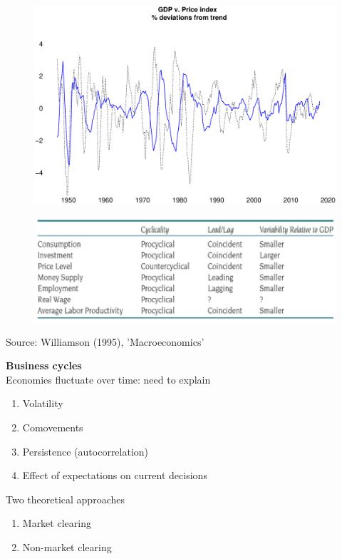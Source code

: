 \documentclass{beamer}
\begin{document}
\begin{frame}
  \begin{figure}
    \includegraphics[scale=.25]{business_cycle3.eps}
  \end{figure}
\end{frame}

\begin{frame}
  \begin{figure}
    \includegraphics[scale=.8]{williamson.eps}
  \end{figure}
  Source: Williamson (1995), 'Macroeconomics'
\end{frame}

\begin{frame}
  \textbf{Business cycles}\\
  Economies fluctuate over time: need to explain
  \begin{enumerate}
    \item Volatility
    \item Comovements
    \item Persistence (autocorrelation)
    \item Effect of expectations on current decisions
  \end{enumerate}
  \medskip
  Two theoretical approaches 
  \begin{enumerate}
    \item Market clearing
    \item Non-market clearing
  \end{enumerate}
\end{frame}
\end{document}
